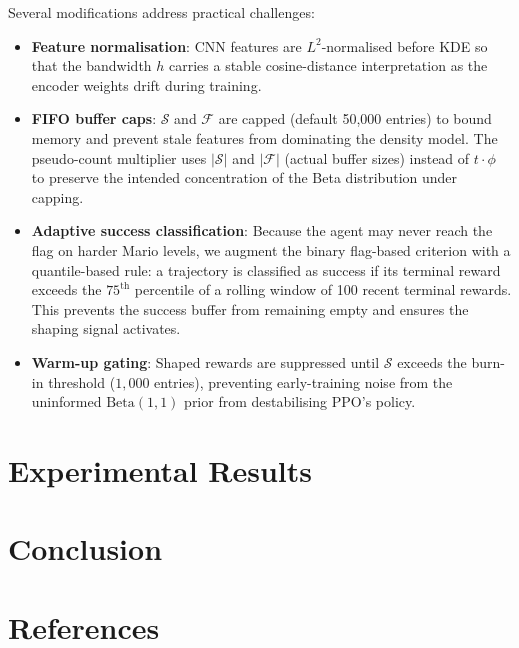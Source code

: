 \documentclass{article}
\begin{document}
Several modifications address practical challenges:
\begin{itemize}
    \item \textbf{Feature normalisation}: CNN features are $L^2$-normalised before KDE so that the bandwidth $h$ carries a stable cosine-distance interpretation as the encoder weights drift during training.
    \item \textbf{FIFO buffer caps}: $\mathcal{S}$ and $\mathcal{F}$ are capped (default 50{,}000 entries) to bound memory and prevent stale features from dominating the density model. The pseudo-count multiplier uses $|\mathcal{S}|$ and $|\mathcal{F}|$ (actual buffer sizes) instead of $t \cdot \phi$ to preserve the intended concentration of the Beta distribution under capping.
    \item \textbf{Adaptive success classification}: Because the agent may never reach the flag on harder Mario levels, we augment the binary flag-based criterion with a quantile-based rule: a trajectory is classified as success if its terminal reward exceeds the $75^\text{th}$ percentile of a rolling window of 100 recent terminal rewards. This prevents the success buffer from remaining empty and ensures the shaping signal activates.
    \item \textbf{Warm-up gating}: Shaped rewards are suppressed until $\mathcal{S}$ exceeds the burn-in threshold ($1{,}000$ entries), preventing early-training noise from the uninformed $\mathrm{Beta}(1, 1)$ prior from destabilising PPO's policy.
\end{itemize}

\section{Experimental Results}
\label{sec:results}


\section{Conclusion}
\label{sec:conclusion}


\section*{References}
{
\small

 
}
\end{document}
